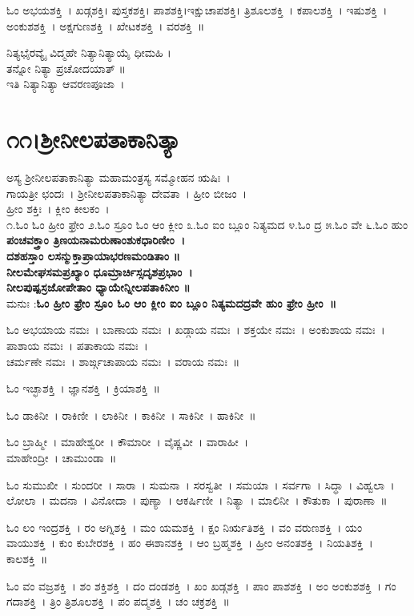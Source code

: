 ಓಂ ಅಭಯಶಕ್ತಿ~। ಖಡ್ಗಶಕ್ತಿ। ಪುಸ್ತಕಶಕ್ತಿ। ಪಾಶಶಕ್ತಿ।ಇಕ್ಷುಚಾಪಶಕ್ತಿ। ತ್ರಿಶೂಲಶಕ್ತಿ~। ಕಪಾಲಶಕ್ತಿ~। ಇಷುಶಕ್ತಿ~। ಅಂಕುಶಶಕ್ತಿ~। ಅಕ್ಷಗುಣಶಕ್ತಿ~। ಖೇಟಕಶಕ್ತಿ~। ವರಶಕ್ತಿ~॥

ನಿತ್ಯಭೈರವ್ಯೈ ವಿದ್ಮಹೇ ನಿತ್ಯಾನಿತ್ಯಾಯೈ ಧೀಮಹಿ ।\\ತನ್ನೋ ನಿತ್ಯಾ ಪ್ರಚೋದಯಾತ್ ॥\\
ಇತಿ ನಿತ್ಯಾನಿತ್ಯಾ ಆವರಣಪೂಜಾ~।
\section{೧೧।ಶ್ರೀನೀಲಪತಾಕಾನಿತ್ಯಾ}
ಅಸ್ಯ ಶ್ರೀನೀಲಪತಾಕಾನಿತ್ಯಾ ಮಹಾಮಂತ್ರಸ್ಯ ಸಮ್ಮೋಹನ ಋಷಿಃ~। \\ಗಾಯತ್ರೀ ಛಂದಃ~। ಶ್ರೀನೀಲಪತಾಕಾನಿತ್ಯಾ ದೇವತಾ~। ಹ್ರೀಂ ಬೀಜಂ~।\\ ಹ್ರೀಂ ಶಕ್ತಿಃ~। ಕ್ಲೀಂ ಕೀಲಕಂ~।\\
೧.ಓಂ ಓಂ ಹ್ರೀಂ ಫ್ರೇಂ ೨.ಓಂ ಸ್ರೂಂ ಓಂ ಆಂ ಕ್ಲೀಂ ೩.ಓಂ ಐಂ ಬ್ಲೂಂ ನಿತ್ಯಮದ ೪.ಓಂ ದ್ರ ೫.ಓಂ ವೇ ೬.ಓಂ ಹುಂ \\
{\bfseries ಪಂಚವಕ್ತ್ರಾಂ ತ್ರಿಣಯನಾಮರುಣಾಂಶುಕಧಾರಿಣೀಂ~।\\
ದಶಹಸ್ತಾಂ ಲಸನ್ಮುಕ್ತಾಪ್ರಾಯಾಭರಣಮಂಡಿತಾಂ ॥\\
ನೀಲಮೇಘಸಮಪ್ರಖ್ಯಾಂ ಧೂಮ್ರಾರ್ಚಿಸ್ಸದೃಶಪ್ರಭಾಂ~।\\
ನೀಲಪುಷ್ಪಸ್ರಜೋಪೇತಾಂ ಧ್ಯಾಯೇನ್ನೀಲಪತಾಕಿನೀಂ ॥\\}
ಮನುಃ :{\bfseries ಓಂ ಹ್ರೀಂ ಫ್ರೇಂ ಸ್ರೂಂ ಓಂ ಆಂ ಕ್ಲೀಂ ಐಂ ಬ್ಲೂಂ ನಿತ್ಯಮದದ್ರವೇ ಹುಂ ಫ್ರೇಂ ಹ್ರೀಂ~॥}

ಓಂ ಅಭಯಾಯ ನಮಃ~। ಬಾಣಾಯ ನಮಃ~। ಖಡ್ಗಾಯ ನಮಃ~। ಶಕ್ತಯೇ ನಮಃ~। ಅಂಕುಶಾಯ ನಮಃ~। ಪಾಶಾಯ ನಮಃ~। ಪತಾಕಾಯ ನಮಃ~। \\ ಚರ್ಮಣೇ ನಮಃ~। ಶಾರ್ಙ್ಗಚಾಪಾಯ ನಮಃ~। ವರಾಯ ನಮಃ~॥

ಓಂ ಇಚ್ಛಾಶಕ್ತಿ~। ಜ್ಞಾನಶಕ್ತಿ~। ಕ್ರಿಯಾಶಕ್ತಿ~॥ 

ಓಂ ಡಾಕಿನೀ~। ರಾಕಿಣೀ~। ಲಾಕಿನೀ~। ಕಾಕಿನೀ~। ಸಾಕಿನೀ~। ಹಾಕಿನೀ~॥ 

ಓಂ ಬ್ರಾಹ್ಮೀ~। ಮಾಹೇಶ್ವರೀ~। ಕೌಮಾರೀ~। ವೈಷ್ಣವೀ~। ವಾರಾಹೀ~। \\ ಮಾಹೇಂದ್ರೀ~। ಚಾಮುಂಡಾ~॥ 

ಓಂ ಸುಮುಖೀ~। ಸುಂದರೀ~। ಸಾರಾ~। ಸುಮನಾ~। ಸರಸ್ವತೀ~। ಸಮಯಾ~। ಸರ್ವಗಾ~। ಸಿದ್ಧಾ~। ವಿಹ್ವಲಾ~। ಲೋಲಾ~। ಮದನಾ~। ವಿನೋದಾ~। ಪುಣ್ಯಾ~। ಆಕರ್ಷಿಣೀ~। ನಿತ್ಯಾ~। ಮಾಲಿನೀ~। ಕೌತುಕಾ~। ಪುರಾಣಾ~॥ 

ಓಂ ಲಂ ಇಂದ್ರಶಕ್ತಿ~। ರಂ ಅಗ್ನಿಶಕ್ತಿ~। ಮಂ ಯಮಶಕ್ತಿ~। ಕ್ಷಂ ನಿರ್ಋತಿಶಕ್ತಿ~। ವಂ ವರುಣಶಕ್ತಿ~। ಯಂ ವಾಯುಶಕ್ತಿ~। ಕುಂ ಕುಬೇರಶಕ್ತಿ~। ಹಂ ಈಶಾನಶಕ್ತಿ~। ಆಂ ಬ್ರಹ್ಮಶಕ್ತಿ~। ಹ್ರೀಂ ಅನಂತಶಕ್ತಿ~। ನಿಯತಿಶಕ್ತಿ~। ಕಾಲಶಕ್ತಿ~॥ 

ಓಂ ವಂ ವಜ್ರಶಕ್ತಿ~। ಶಂ ಶಕ್ತಿಶಕ್ತಿ~। ದಂ ದಂಡಶಕ್ತಿ~। ಖಂ ಖಡ್ಗಶಕ್ತಿ~। ಪಾಂ ಪಾಶಶಕ್ತಿ~। ಅಂ ಅಂಕುಶಶಕ್ತಿ~। ಗಂ ಗದಾಶಕ್ತಿ~। ತ್ರಿಂ ತ್ರಿಶೂಲಶಕ್ತಿ~। ಪಂ ಪದ್ಮಶಕ್ತಿ~। ಚಂ ಚಕ್ರಶಕ್ತಿ~॥

